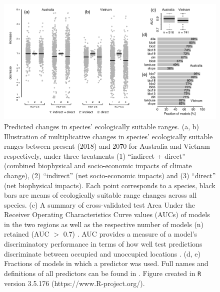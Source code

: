 \documentclass[titlesmallcaps,copyrightpage]{uomthesis}\usepackage[]{graphicx}\usepackage[]{color}
\begin{document}
\begin{figure}[htb]
  \centering
  \includegraphics[width=\textwidth]{chapters/figures/chapter2/fig2.pdf}
  \caption{Predicted changes in species’ ecologically suitable ranges. (a, b) Illustration of multiplicative changes in species’ ecologically suitable ranges between present (2018) and 2070 for Australia and Vietnam respectively, under three treatments (1) “indirect + direct” (combined biophysical and socio-economic impacts of climate change), (2) “indirect” (net socio-economic impacts) and (3) “direct” (net biophysical impacts). Each point corresponds to a species, black bars are means of ecologically suitable range changes across all species. (c) A summary of cross-validated test Area Under the Receiver Operating Characteristics Curve values (AUCs) \citep{jimenez-valverde_insights_2012} of models in the two regions as well as the respective number of models (n) retained (AUC $>$ 0.7) \citep{baldwin_use_2009}. AUC provides a measure of a model’s discriminatory performance in terms of how well test predictions discriminate between occupied and unoccupied locations \citep{jimenez-valverde_insights_2012, baldwin_use_2009}. (d, e) Fractions of models in which a predictor was used. Full names and definitions of all predictors can be found in . Figure created in \texttt{R} version 3.5.176 (https://www.R-project.org/).}
  \label{ch2:fig2}
\end{figure}
\end{document}
